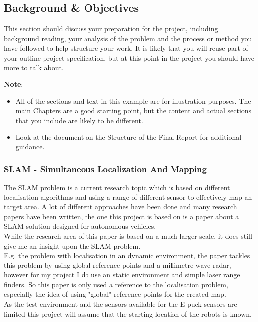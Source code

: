 \begin{flushleft}

\chapter{Background \& Objectives}
\label{Background}

This section should discuss your preparation for the project, including background reading, your analysis of the problem and the process or method you have followed to help structure your work.  It is likely that you will reuse part of your outline project specification, but at this point in the project you should have more to talk about. 

\textbf{Note}: 

\begin{itemize}
   \item All of the sections and text in this example are for illustration purposes. The main Chapters are a good starting point, but the content and actual sections that you include are likely to be different.
   
   \item Look at the document on the Structure of the Final Report for additional guidance. 
   
\end {itemize}

\subsection{SLAM - Simultaneous Localization And Mapping}
The SLAM problem is a current research topic which is based on different localisation algorithms and using a range of different sensor to effectively map an target area. A lot of different approaches have been done and many research papers have been written, the one this project is based on is a paper about a SLAM solution designed for autonomous vehicles\cite{Dissanayake2001Solution}.\\
While the research area of this paper is based on a much larger scale, it does still give me an insight upon the SLAM problem.\\
E.g. the problem with localisation in an dynamic environment, the paper tackles this problem by using global reference points and a millimetre wave radar, however for my project I do use an static environment and simple laser range finders. So this paper is only used a reference to the localisation problem, especially the idea of using "global" reference points for the created map.\\
As the test environment and the sensors available for the E-puck sensors are limited this project will assume that the starting location of the robots is known.\\[3ex]


\end{flushleft}
